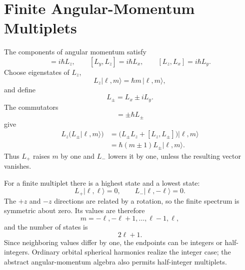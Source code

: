 \section{Finite Angular-Momentum Multiplets}

The components of angular momentum satisfy
\begin{equation}
[L_x,L_y]=i\hbar L_z,\qquad
[L_y,L_z]=i\hbar L_x,\qquad
[L_z,L_x]=i\hbar L_y.
\end{equation}
Choose eigenstates of \(L_z\),
\begin{equation}
L_z|\ell,m\rangle=\hbar m\,|\ell,m\rangle,
\end{equation}
and define
\begin{equation}
L_\pm=L_x\pm iL_y.
\end{equation}
The commutators
\begin{equation}
[L_z,L_\pm]=\pm\hbar L_\pm
\end{equation}
give
\begin{align}
L_z\bigl(L_\pm|\ell,m\rangle\bigr)
&=\bigl(L_\pm L_z+[L_z,L_\pm]\bigr)|\ell,m\rangle \\
&=\hbar(m\pm1)L_\pm|\ell,m\rangle.
\end{align}
Thus \(L_+\) raises \(m\) by one and \(L_-\) lowers it by one, unless the resulting vector vanishes.

For a finite multiplet there is a highest state and a lowest state:
\begin{equation}
L_+|\ell,\ell\rangle=0,
\qquad
L_-|\ell,-\ell\rangle=0.
\end{equation}
The \(+z\) and \(-z\) directions are related by a rotation, so the finite spectrum is symmetric about zero. Its values are therefore
\begin{equation}
m=-\ell,-\ell+1,\ldots,\ell-1,\ell,
\end{equation}
and the number of states is
\begin{equation}
2\ell+1.
\end{equation}
Since neighboring values differ by one, the endpoints can be integers or half-integers. Ordinary orbital spherical harmonics realize the integer case; the abstract angular-momentum algebra also permits half-integer multiplets.

\begin{classroomqa}
\end{classroomqa}

